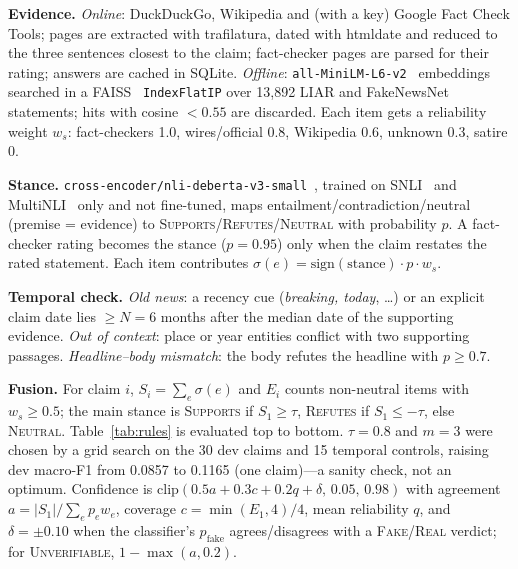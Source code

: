\documentclass[conference]{IEEEtran}
\newcommand{\cls}[1]{\textsc{#1}}          %
\begin{document}
\textbf{Evidence.} \emph{Online}: DuckDuckGo, Wikipedia and (with a key) Google Fact Check Tools; pages are extracted with trafilatura, dated with htmldate and reduced to the three sentences closest to the claim; fact-checker pages are parsed for their rating; answers are cached in SQLite. \emph{Offline}: \texttt{all-MiniLM-L6-v2}~\cite{reimers2019sbert,wang2020minilm} embeddings searched in a FAISS~\cite{johnson2021faiss} \texttt{IndexFlatIP} over 13{,}892 LIAR and FakeNewsNet statements; hits with cosine $<0.55$ are discarded. Each item gets a reliability weight $w_s$: fact-checkers 1.0, wires/official 0.8, Wikipedia 0.6, unknown 0.3, satire 0.

\textbf{Stance.} \texttt{cross-encoder/nli-deberta-v3-small}~\cite{he2023debertav3}, trained on SNLI~\cite{bowman2015snli} and MultiNLI~\cite{williams2018mnli} only and not fine-tuned, maps entailment/contradiction/neutral (premise = evidence) to \textsc{Supports}/\textsc{Refutes}/\textsc{Neutral} with probability $p$. A fact-checker rating becomes the stance ($p=0.95$) only when the claim restates the rated statement. Each item contributes $\sigma(e)=\mathrm{sign}(\mathrm{stance})\cdot p\cdot w_s$.

\textbf{Temporal check.} \emph{Old news}: a recency cue (\emph{breaking, today}, \dots) or an explicit claim date lies $\geq N=6$ months after the median date of the supporting evidence. \emph{Out of context}: place or year entities conflict with two supporting passages. \emph{Headline--body mismatch}: the body refutes the headline with $p\geq 0.7$.

\textbf{Fusion.} For claim $i$, $S_i=\sum_e \sigma(e)$ and $E_i$ counts non-neutral items with $w_s\geq 0.5$; the main stance is \textsc{Supports} if $S_1\geq\tau$, \textsc{Refutes} if $S_1\leq-\tau$, else \textsc{Neutral}. Table~\ref{tab:rules} is evaluated top to bottom. $\tau=0.8$ and $m=3$ were chosen by a grid search on the 30 dev claims and 15 temporal controls, raising dev macro-F1 from 0.0857 to 0.1165 (one claim)---a sanity check, not an optimum. Confidence is $\mathrm{clip}(0.5a+0.3c+0.2q+\delta,\,0.05,\,0.98)$ with agreement $a=|S_1|/\sum_e p_e w_e$, coverage $c=\min(E_1,4)/4$, mean reliability $q$, and $\delta=\pm0.10$ when the classifier's $p_\mathrm{fake}$ agrees/disagrees with a \cls{Fake}/\cls{Real} verdict; for \cls{Unverifiable}, $1-\max(a,0.2)$.
\end{document}
